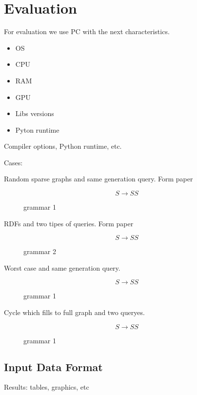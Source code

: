 \section{Evaluation}

For evaluation we use PC with the next characteristics.
\begin{itemize}
  \item OS
  \item CPU
  \item RAM
  \item GPU
  \item Libs versions
  \item Pyton runtime
\end{itemize}

Compiler options, Python runtime, etc.

Cases:

Random sparse graphs and same generation query. Form paper~\cite{!!!}

\begin{figure}
  $$
  S \rightarrow S S
  $$
  \caption{grammar 1}
\end{figure}

RDFs and two tipes of queries. Form paper~\cite{}

\begin{figure}
  $$
  S \rightarrow S S
  $$
  \caption{grammar 2}
\end{figure}


Worst case and same generation query.

\begin{figure}
  $$
  S \rightarrow S S
  $$
  \caption{grammar 1}
\end{figure}


Cycle which fills to full graph and two queryes.

\begin{figure}
  $$
  S \rightarrow S S
  $$
  \caption{grammar 1}
\end{figure}


\subsection{Input Data Format}

Results: tables, graphics, etc
